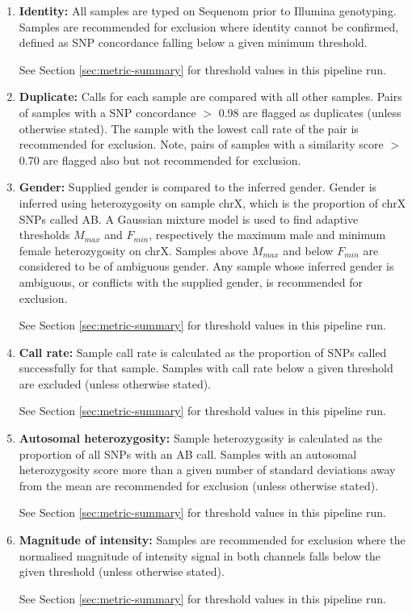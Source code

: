 \begin{enumerate}
\item \textbf{Identity:}  All samples are typed on Sequenom prior to Illumina genotyping.  Samples are recommended for exclusion where identity cannot be confirmed, defined as SNP concordance falling below a given minimum threshold.  

See Section \ref{sec:metric-summary} for threshold values in this pipeline run.

\item \textbf{Duplicate:}  Calls for each sample are compared with all other samples.  Pairs of samples with a SNP concordance $>$ 0.98 are flagged as duplicates (unless otherwise stated).  The sample with the lowest call rate of the pair is recommended for exclusion.  Note, pairs of samples with a similarity score $>$ 0.70 are flagged also but not recommended for exclusion.

\item \textbf{Gender:} Supplied gender is compared to the inferred gender. Gender is inferred using heterozygosity on sample chrX, which is the proportion of chrX SNPs called AB. A Gaussian mixture model is used to find adaptive thresholds $M_{max}$ and $F_{min}$, respectively the maximum male and minimum female heterozygosity on chrX.  Samples above $M_{max}$ and below $F_{min}$ are considered to be of ambiguous gender.  Any sample whose inferred gender is ambiguous, or conflicts with the supplied gender, is recommended for exclusion.

See Section \ref{sec:metric-summary} for threshold values in this pipeline run.

\item \textbf{Call rate:} Sample call rate is calculated as the proportion of SNPs called successfully for that sample.  Samples with call rate below a given threshold are excluded (unless otherwise stated). 

See Section \ref{sec:metric-summary} for threshold values in this pipeline run.

\item \textbf{Autosomal heterozygosity:}  Sample heterozygosity is calculated as the proportion of all SNPs with an AB call.  Samples with an autosomal heterozygosity score more than a given number of standard deviations away from the mean are recommended for exclusion (unless otherwise stated).  

See Section \ref{sec:metric-summary} for threshold values in this pipeline run.

\item \textbf{Magnitude of intensity:} Samples are recommended for exclusion where the normalised magnitude of intensity signal in both channels falls below the given threshold (unless otherwise stated). 

See Section \ref{sec:metric-summary} for threshold values in this pipeline run.
\end{enumerate}
